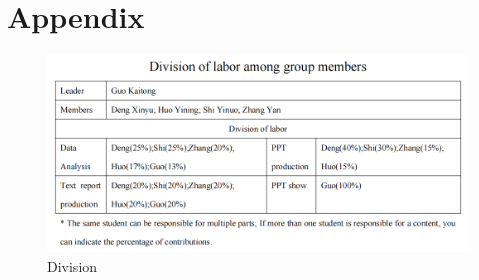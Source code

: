 \documentclass[
  man,floatsintext]{apa6}
\begin{document}
\section{Appendix}\label{appendix}

\begin{figure}
\centering
\includegraphics{./table/division.png}
\caption{Division}
\end{figure}


\clearpage
\renewcommand{\listtablename}{Table captions}
\end{document}
